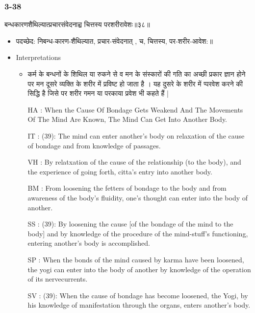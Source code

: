 \begin{frame}[fragile]\frametitle{3-38}
\begin{sanskrit}
बन्धकारणशैथिल्यात्प्रचारसंवेदनाच्च चित्तस्य परशरीरावेशः॥३८॥
\end{sanskrit}

	\begin{itemize}
	\item पदच्छेद:  निबन्ध-कारण-शैथिल्यात, प्रचार-संवेदनात् , च, चित्तस्य, पर-शरीर-आवेश:॥
	\item Interpretations
		\begin{itemize}	
		\item  कर्म के बन्धनों के शिथिल या रुकने से व मन के संस्कारों की गति का अच्छी प्रकार ज्ञान होने पर मन दूसरे व्यक्ति के शरीर में प्रविष्ट हो जाता है । यह दुसरे के शरीर में प्परवेश करने की सिद्धि है जिसे पर शरीर गमन या परकाया प्रवेश भी कहते हैं | 
		\item [HA]: When the Cause Of Bondage Gets Weakend And The Movements Of The Mind Are Known, The Mind Can Get Into Another Body.
		\item [IT]: (39): The mind can enter another’s body on relaxation of the cause of bondage and from knowledge of passages.
		\item [VH]: By relatxation of the cause of the relationship (to the body), and the experience of going forth, citta’s entry into another body.
		\item [BM]: From loosening the fetters of bondage to the body and from awareness of the body’s fluidity, one’s thought can enter into the body of another.
		\item [SS]: (39): By loosening the cause [of the bondage of the mind to the body] and by knowledge of the procedure of the mind-stuff’s functioning, entering another’s body is accomplished.
		\item [SP]: When the bonds of the mind caused by karma have been loosened, the yogi can enter into the body of another by knowledge of the operation of its nervecurrents.
		\item [SV]: (39): When the cause of bondage has become loosened, the Yogi, by his knowledge of manifestation through the organs, enters another’s body. 
		\end{itemize}
	\end{itemize}
\end{frame}


